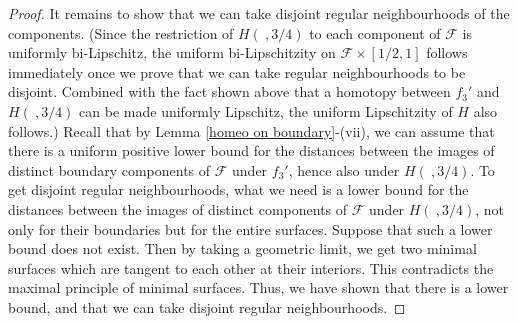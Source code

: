 \documentclass{amsart}
\theoremstyle{definition}
\numberwithin{figure}{section}
\numberwithin{equation}{section}
\def\cv{\mathcal{V}}
\begin{document}
\begin{proof}
It remains to show that we can take disjoint regular neighbourhoods of the components.
(Since the restriction of $H(\ ,3/4)$ to each component of $\mathcal F$ is uniformly bi-Lipschitz, the uniform bi-Lipschitzity on $\mathcal F \times [1/2,1]$ follows immediately once we prove that we can take regular neighbourhoods to be disjoint.
Combined with the fact shown above that a homotopy between $f_3'$ and $H(\ , 3/4)$ can be made uniformly Lipschitz, the uniform Lipschitzity of $H$ also follows.)
Recall that by Lemma \ref{homeo on boundary}-(vii),  we can assume that there is a uniform positive lower bound for the distances between the images of distinct boundary components of $\mathcal F$ under $f_3'$, hence also under $H(\ , 3/4)$.
To get disjoint regular neighbourhoods, what we need is a lower bound for the distances between the images of distinct components of $\mathcal F$ under $H(\ , 3/4)$, not only for their boundaries but for the entire surfaces.
Suppose that such a lower bound does not exist.
Then by taking a geometric limit, we get two minimal surfaces which are tangent to each other at their interiors.
This contradicts the maximal principle of minimal surfaces.
Thus, we have shown that there is a lower bound, and that we can take disjoint regular neighbourhoods.
%
%

\end{proof}
\end{document}
